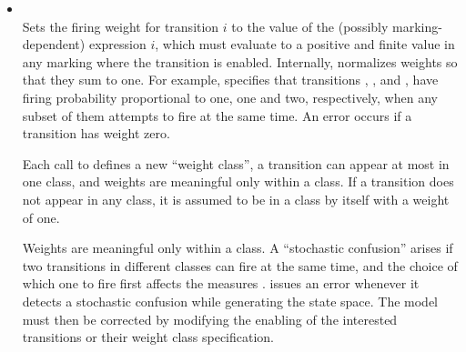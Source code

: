 \begin{developer}
\begin{itemize}
\item
{}\\
Sets the firing weight for transition $i$ to the value of the
(possibly marking-dependent)  expression $i$,
which must evaluate to a positive and finite value in any marking
where the transition is enabled.
Internally, {\smart} normalizes weights so that they sum to one.
For example,  specifies that transitions
, , and , have firing probability proportional
to one, one and two, respectively, when any subset of them attempts
to fire at the same time.
An error occurs if a transition has weight zero.

Each call to  defines a new ``weight class'',
a transition can appear at most in one class,
and weights are meaningful only within a class.
If a transition does not appear in any class, it is assumed to be in a class
by itself with a weight of one.

Weights are meaningful only within a class.  A ``stochastic
confusion'' arises if two transitions in different classes can fire at
the same time, and the choice of which one to fire first affects the
measures \cite{1996MASCOTS-StochasticConfusion}.
{\smart} issues an error whenever
it detects a stochastic confusion while generating the state space.
The model must then be corrected by modifying the enabling of the
interested transitions or their weight class specification.




\end{itemize}
\end{developer}
